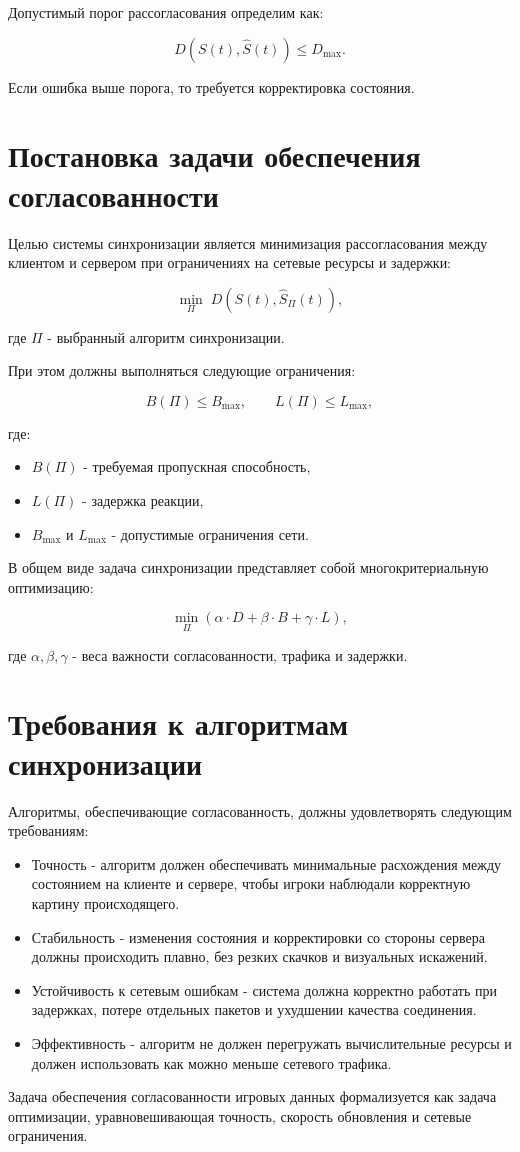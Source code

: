 Допустимый порог рассогласования определим как:

\[
D(S(t), \hat{S}(t)) \leqslant D_{\text{max}}.
\]

Если ошибка выше порога, то требуется корректировка состояния.

\section{Постановка задачи обеспечения согласованности}

Целью системы синхронизации является минимизация рассогласования между клиентом и сервером при ограничениях на сетевые ресурсы и задержки:

\[
\min_{\Pi} \; D\left(S(t), \hat{S}_{\Pi}(t)\right),
\]

где $\Pi$ - выбранный алгоритм синхронизации.

При этом должны выполняться следующие ограничения:

\[
B(\Pi) \leqslant B_{\text{max}}, \qquad 
L(\Pi) \leqslant L_{\text{max}},
\]

где:
\begin{itemize}
    \item $B(\Pi)$ - требуемая пропускная способность,
    \item $L(\Pi)$ - задержка реакции,
    \item $B_{\text{max}}$ и $L_{\text{max}}$ - допустимые ограничения сети.
\end{itemize}

В общем виде задача синхронизации представляет собой многокритериальную оптимизацию:

\[
\min_{\Pi} \left(
    \alpha \cdot D +
    \beta \cdot B +
    \gamma \cdot L
\right),
\]

где $\alpha, \beta, \gamma$ - веса важности согласованности, трафика и задержки.

\section{Требования к алгоритмам синхронизации}

Алгоритмы, обеспечивающие согласованность, должны удовлетворять следующим требованиям:

\begin{itemize}
    \item Точность - алгоритм должен обеспечивать минимальные расхождения 
    между состоянием на клиенте и сервере, чтобы игроки наблюдали корректную картину происходящего.
    \item Стабильность - изменения состояния и корректировки со стороны сервера 
    должны происходить плавно, без резких скачков и визуальных искажений.
    \item Устойчивость к сетевым ошибкам - система должна корректно работать при задержках, потере отдельных пакетов и ухудшении качества соединения.
    \item Эффективность - алгоритм не должен перегружать вычислительные ресурсы 
    и должен использовать как можно меньше сетевого трафика.
\end{itemize}

Задача обеспечения согласованности игровых данных формализуется как задача оптимизации, уравновешивающая точность, скорость обновления и сетевые ограничения.